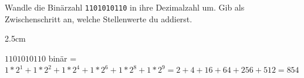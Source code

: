 \question[2]
Wandle die Binärzahl \texttt{1101010110} in ihre Dezimalzahl um.
Gib als Zwischenschritt an, welche Stellenwerte du addierst.

\begin{solutionbox}{2.5cm}

$1101010110$ binär = $1*2^1 + 1*2^2 + 1*2^4 + 1*2^6 + 1*2^8 + 1*2^9 = 2 + 4 + 16 + 64 + 256 + 512 = 854$

\end{solutionbox}